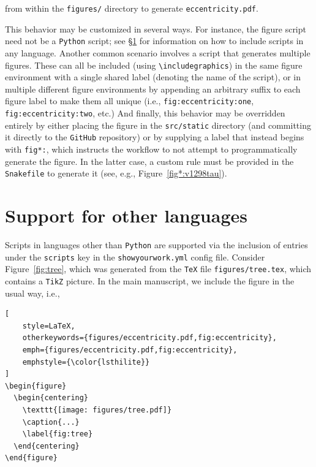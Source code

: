 \documentclass[twocolumn]{aastex631}
\begin{document}
\noindent from within the \texttt{figures/} directory to generate \texttt{eccentricity.pdf}.

This behavior may be customized in several ways. 
For instance, the figure script need not be a \texttt{Python} script; see \S\ref{sec:other-lang} for information on how to include scripts in any language.
Another common scenario involves a script that generates multiple figures. These can all be included (using \texttt{{\textbackslash}includegraphics}) in the same figure environment with a single shared label (denoting the name of the script), or in multiple different figure environments by appending an arbitrary suffix to each figure label to make them all unique (i.e., \texttt{fig:eccentricity:one}, \texttt{fig:eccentricity:two}, etc.)
And finally, this behavior may be overridden entirely by either placing the figure in the \texttt{src/static} directory (and committing it directly to the \texttt{GitHub} repository) or by supplying a label that instead begins with \texttt{fig*:}, which instructs the workflow to not attempt to programmatically generate the figure.
In the latter case, a custom rule must be provided in the \texttt{Snakefile} to generate it (see, e.g., Figure~\ref{fig*:v1298tau}).



\section{Support for other languages}
\label{sec:other-lang}
%
Scripts in languages other than \texttt{Python} are supported via the inclusion of entries under the \texttt{scripts} key in the \texttt{showyourwork.yml} config file. 
Consider Figure~\ref{fig:tree}, which was generated from the \texttt{TeX} file \texttt{figures/tree.tex}, which contains a \texttt{TikZ} picture. 
In the main manuscript, we include the figure in the usual way, i.e.,\\

\noindent\begin{minipage}{\linewidth}
\begin{lstlisting}[
    style=LaTeX,
    otherkeywords={figures/eccentricity.pdf,fig:eccentricity},
    emph={figures/eccentricity.pdf,fig:eccentricity},
    emphstyle={\color{lsthilite}}
]
\begin{figure}
  \begin{centering}
    \texttt{[image: figures/tree.pdf]}
    \caption{...}
    \label{fig:tree}
  \end{centering}
\end{figure}
\end{lstlisting}
\end{minipage}
\end{document}
